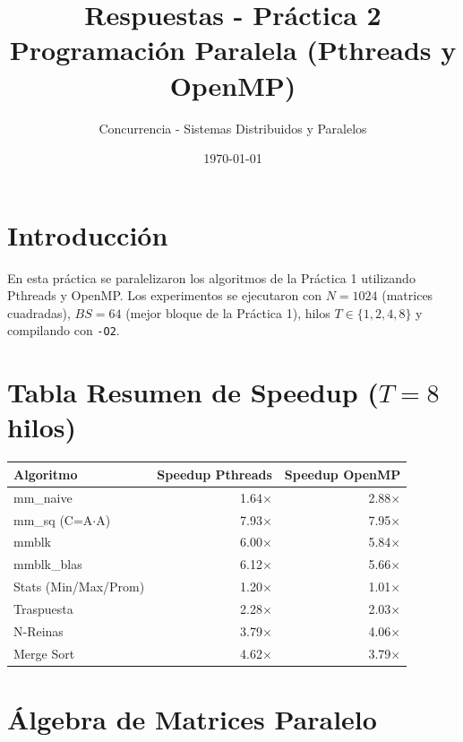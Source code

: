 \documentclass[11pt,a4paper]{article}
\title{Respuestas - Práctica 2\\Programación Paralela (Pthreads y OpenMP)}
\author{Concurrencia - Sistemas Distribuidos y Paralelos}
\date{\today}
\begin{document}
\maketitle

\section*{Introducción}
En esta práctica se paralelizaron los algoritmos de la Práctica 1 utilizando Pthreads y OpenMP. Los experimentos se ejecutaron con $N=1024$ (matrices cuadradas), $BS=64$ (mejor bloque de la Práctica 1), hilos $T \in \{1, 2, 4, 8\}$ y compilando con \texttt{-O2}.

\tableofcontents

\newpage

\section*{Tabla Resumen de Speedup ($T=8$ hilos)}

\begin{center}
\begin{tabular}{|l|r|r|}
\hline
\textbf{Algoritmo} & \textbf{Speedup Pthreads} & \textbf{Speedup OpenMP} \\
\hline
mm\_naive            & 1.64$\times$ & 2.88$\times$ \\
mm\_sq (C=A$\cdot$A) & 7.93$\times$ & 7.95$\times$ \\
mmblk                & 6.00$\times$ & 5.84$\times$ \\
mmblk\_blas          & 6.12$\times$ & 5.66$\times$ \\
Stats (Min/Max/Prom) & 1.20$\times$ & 1.01$\times$ \\
Traspuesta           & 2.28$\times$ & 2.03$\times$ \\
N-Reinas             & 3.79$\times$ & 4.06$\times$ \\
Merge Sort           & 4.62$\times$ & 3.79$\times$ \\
\hline
\end{tabular}
\end{center}

\newpage

\section{Álgebra de Matrices Paralelo}
\end{document}
